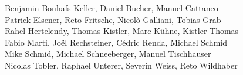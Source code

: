 %
%
%
Benjamin Bouhafs-Keller,	%
Daniel Bucher, 			%
Manuel Cattaneo%
\\
Patrick Elsener,		%
Reto Fritsche,			%
Nicolò Galliani,		%
Tobias Grab%
\\
Rahel Hertelendy,		%
Thomas Kistler,			%
Marc Kühne,			%
Kistler Thomas%
\\
Fabio Marti,			%
Joël Rechsteiner,		%
Cédric Renda,			%
Michael Schmid%
\\
Mike Schmid,			%
Michael Schneeberger,		%
Manuel Tischhauser%
\\
Nicolas Tobler,			%
Raphael Unterer,		%
Severin Weiss,			%
Reto Wildhaber			%
